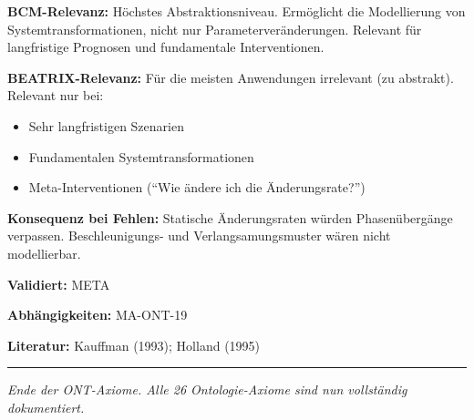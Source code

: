 \textbf{BCM-Relevanz:}
Höchstes Abstraktionsniveau. Ermöglicht die Modellierung von Systemtransformationen, nicht nur Parameterveränderungen. Relevant für langfristige Prognosen und fundamentale Interventionen.

\textbf{BEATRIX-Relevanz:}
Für die meisten Anwendungen irrelevant (zu abstrakt). Relevant nur bei:
\begin{itemize}
    \item Sehr langfristigen Szenarien
    \item Fundamentalen Systemtransformationen
    \item Meta-Interventionen (``Wie ändere ich die Änderungsrate?'')
\end{itemize}

\textbf{Konsequenz bei Fehlen:}
Statische Änderungsraten würden Phasenübergänge verpassen. Beschleunigungs- und Verlangsamungsmuster wären nicht modellierbar.

\textbf{Validiert:} META

\textbf{Abhängigkeiten:} MA-ONT-19

\textbf{Literatur:} Kauffman (1993); Holland (1995)


\bigskip
\noindent\rule{\textwidth}{0.4pt}
\textit{Ende der ONT-Axiome. Alle 26 Ontologie-Axiome sind nun vollständig dokumentiert.}
